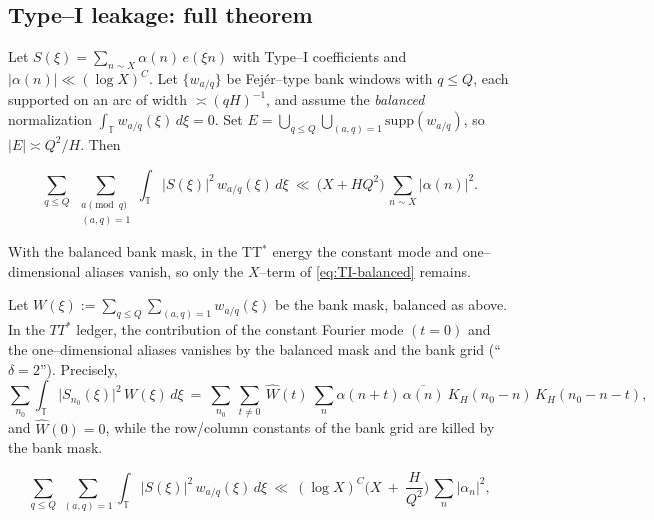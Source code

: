 \subsection{Type–I leakage: full theorem}\label{sec:typeI}
\begin{theorem}\label{thm:typeI-balanced}
Let $S(\xi)=\sum_{n\sim X}\alpha(n)\,e(\xi n)$ with Type--I coefficients and $|\alpha(n)|\ll (\log X)^C$.
Let $\{w_{a/q}\}$ be Fejér--type bank windows with $q\le Q$, each supported on an arc of width $\asymp (qH)^{-1}$, and assume the \emph{balanced} normalization $\int_{\mathbb T} w_{a/q}(\xi)\,d\xi=0$.
Set $E=\bigcup_{q\le Q}\bigcup_{(a,q)=1}\mathrm{supp}(w_{a/q})$, so $|E|\asymp Q^2/H$.
Then

\begin{equation}\label{eq:TI-balanced}
\sum_{q\le Q}\ \sum_{\substack{a \!\!\!\!\pmod q\\(a,q)=1}}
\int_{\mathbb T} |S(\xi)|^2\,w_{a/q}(\xi)\,d\xi
\ \ll\ 
\bigl(X+H Q^2\bigr)\,\sum_{n\sim X}|\alpha(n)|^2.
\tag{7.5}
\end{equation}

\begin{lemma}\label{lem:delta2}
With the balanced bank mask, in the TT$^\ast$ energy the constant mode and one–dimensional aliases vanish, so only the $X$–term of \eqref{eq:TI-balanced} remains.
\end{lemma}

\end{theorem}

\begin{lemma}\label{lem:alias-supp}
Let $W(\xi):=\sum_{q\le Q}\sum_{(a,q)=1} w_{a/q}(\xi)$ be the bank mask, balanced as above. In the $TT^\ast$ ledger, the contribution of the constant Fourier mode $(t=0)$ and the one–dimensional aliases vanishes by the balanced mask and the bank grid (``$\delta=2$''). Precisely,
\[
\sum_{n_0}\int_{\mathbb T} \big|S_{n_0}(\xi)\big|^2\,W(\xi)\,d\xi
\ =\ \sum_{n_0}\ \sum_{t\ne 0}\ \widehat W(t)\ \sum_{n}\alpha(n+t)\,\overline{\alpha(n)}\ K_H(n_0-n)\,K_H(n_0-n-t),
\]
and $\widehat W(0)=0$, while the row/column constants of the bank grid are killed by the bank mask. 

\begin{equation}\label{eq:hybrid-TI}
\sum_{q\le Q}\ \sum_{(a,q)=1}
\int_{\mathbb T} |S(\xi)|^2\,w_{a/q}(\xi)\,d\xi
\ \ll\ (\log X)^C\Big( X\ +\ \frac{H}{Q^2}\Big)\,\sum_n |\alpha_n|^2,
\end{equation}

\end{lemma}

